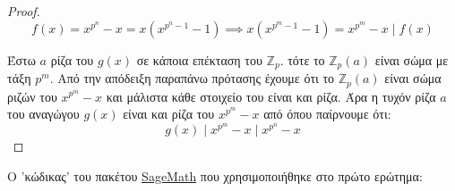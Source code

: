 \documentclass[oneside,a4paper]{article}
\newcommand {\tl}{\textlatin}
\newcommand{\Z}{\mathbb{Z}}
\begin{document}
\begin{enumerate}
\begin{proof}
				$$f(x) = x^{p^n} - x = x(x^{p^n - 1} - 1) \implies x(x^{p^m -1 } - 1) = x^{p^m} - x \mid f(x)$$ 

				Έστω $a$ ρίζα του $g(x)$ σε κάποια επέκταση του $\Z_p$. τότε το $\Z_p (a)$ είναι σώμα με τάξη $p^m$. Από την απόδειξη παραπάνω πρότασης έχουμε ότι το $\Z_p (a)$ είναι σώμα ριζών του $x^{p^m} - x$ και μάλιστα κάθε στοιχείο του είναι και ρίζα. Άρα η τυχόν ρίζα $a$ του αναγώγου $g(x)$ είναι και ρίζα του $x^{p^m} - x$ από όπου παίρνουμε ότι:
				$$g(x) \mid x^{p^m} - x \mid x^{p^n} - x$$
			\end{proof}
\end{enumerate}








\newpage


\noindent O 'κώδικας' του πακέτου \href{www.sagemath.org}{\tl{SageMath}} που χρησιμοποιήθηκε στο πρώτο ερώτημα:
\end{document}
